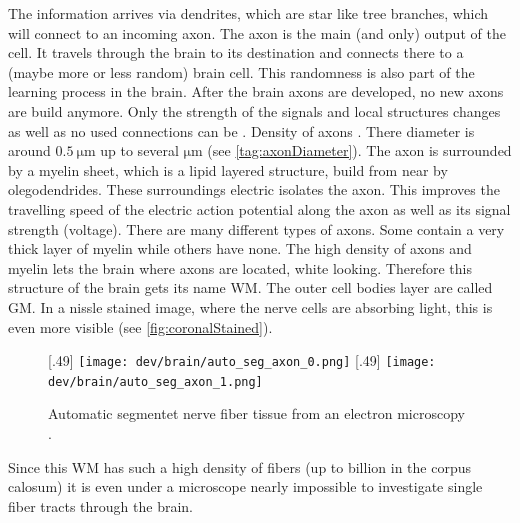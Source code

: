 The information arrives via dendrites, which are star like tree branches, which will connect to an incoming axon.
The axon is the main (and only) output of the cell.
It travels through the brain to its destination and connects there to a (maybe more or less random) brain cell.
This randomness is also part of the learning process in the brain.
After the brain axons are developed, no new axons are build anymore.
Only the strength of the signals and local structures changes as well as no used connections can be .
Density of axons \dummy{}.
There diameter is around $\SI{0.5}{\micro\meter}$ up to several $\si{\micro\meter}$ (see \cref{tag:axonDiameter}).
The axon is surrounded by a myelin sheet, which is a lipid layered structure, build from near by olegodendrides.
These surroundings electric isolates the axon.
This improves the travelling speed of the electric action potential along the axon as well as its signal strength (voltage).
There are many different types of axons.
Some contain a very thick layer of myelin while others have none.
The high density of axons and myelin lets the brain where axons are located, white looking.
Therefore this structure of the brain gets its name \ac{WM}.
The outer cell bodies layer are called \ac{GM}.
In a nissle stained image, where the nerve cells are absorbing light, this is even more visible (see \cref{fig:coronalStained}).
\par
% 
% 
\begin{figure}[!t]
	\centering
	\subcaptionbox{}[.49\textwidth]{
	    \texttt{[image: dev/brain/auto\_seg\_axon\_0.png]}}\hfill
    \subcaptionbox{}[.49\textwidth]{
        \texttt{[image: dev/brain/auto\_seg\_axon\_1.png]}}
	\caption{Automatic segmentet nerve fiber tissue from an electron microscopy \cite{Abdollahzadeh2019}. }
\end{figure}
% 
Since this \ac{WM} has such a high density of fibers (up to billion in the corpus calosum) it is even under a microscope nearly impossible to investigate single fiber tracts through the brain.
